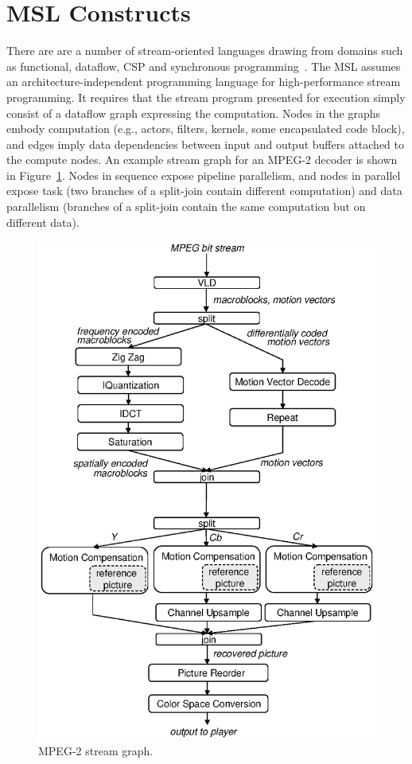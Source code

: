 \section{MSL Constructs}

There are are a number of stream-oriented languages drawing from
domains such as functional, dataflow, CSP and synchronous
programming~\cite{survey97}. The MSL assumes an
architecture-independent programming language for high-performance
stream programming. It requires that the stream program presented for
execution simply consist of a dataflow graph expressing the
computation. Nodes in the graphs embody computation (e.g., actors,
filters, kernels, some encapsulated code block), and edges imply data
dependencies between input and output buffers attached to the compute
nodes. An example stream graph for an MPEG-2 decoder is shown in
Figure~\ref{fig:mpeg}. Nodes in sequence expose pipeline parallelism,
and nodes in parallel expose task (two branches of a split-join
contain different computation) and data parallelism (branches of a
split-join contain the same computation but on different data).

\begin{figure}[tb]
\begin{center}
\includegraphics[scale=.70]{figs/mpeg2d}
\end{center}
\caption[MPEG-2 stream graph.]{MPEG-2 stream graph.}
\label{fig:mpeg}
\end{figure}

